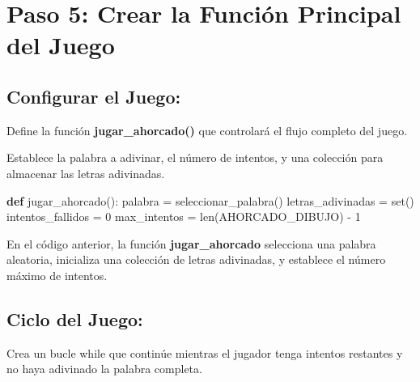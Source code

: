 \documentclass[
  a4paper,
  DIV=11,
  numbers=noendperiod,
  onepage,
  openany]{scrreprt}
\newenvironment{Shaded}{\begin{snugshade}}{\end{snugshade}}
\newcommand{\BuiltInTok}[1]{\textcolor[rgb]{0.00,0.23,0.31}{#1}}
\newcommand{\DecValTok}[1]{\textcolor[rgb]{0.68,0.00,0.00}{#1}}
\newcommand{\KeywordTok}[1]{\textcolor[rgb]{0.00,0.23,0.31}{\textbf{#1}}}
\newcommand{\NormalTok}[1]{\textcolor[rgb]{0.00,0.23,0.31}{#1}}
\newcommand{\OperatorTok}[1]{\textcolor[rgb]{0.37,0.37,0.37}{#1}}
\begin{document}
\section{Paso 5: Crear la Función Principal del
Juego}\label{paso-5-crear-la-funciuxf3n-principal-del-juego}

\subsection{Configurar el Juego:}\label{configurar-el-juego}

Define la función \textbf{jugar\_ahorcado()} que controlará el flujo
completo del juego.

Establece la palabra a adivinar, el número de intentos, y una colección
para almacenar las letras adivinadas.

\begin{Shaded}
\begin{Highlighting}[]
\KeywordTok{def}\NormalTok{ jugar\_ahorcado():}
\NormalTok{    palabra }\OperatorTok{=}\NormalTok{ seleccionar\_palabra()}
\NormalTok{    letras\_adivinadas }\OperatorTok{=} \BuiltInTok{set}\NormalTok{()}
\NormalTok{    intentos\_fallidos }\OperatorTok{=} \DecValTok{0}
\NormalTok{    max\_intentos }\OperatorTok{=} \BuiltInTok{len}\NormalTok{(AHORCADO\_DIBUJO) }\OperatorTok{{-}} \DecValTok{1}
\end{Highlighting}
\end{Shaded}

En el código anterior, la función \textbf{jugar\_ahorcado} selecciona
una palabra aleatoria, inicializa una colección de letras adivinadas, y
establece el número máximo de intentos.

\subsection{Ciclo del Juego:}\label{ciclo-del-juego}

Crea un bucle while que continúe mientras el jugador tenga intentos
restantes y no haya adivinado la palabra completa.
\end{document}
